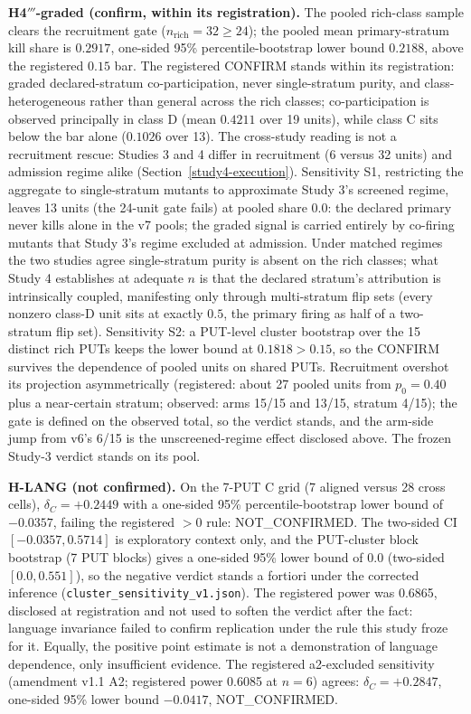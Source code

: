 \documentclass[manuscript,screen,review]{acmart}
\begin{document}
\textbf{H4\('''\)-graded (confirm, within its registration).} The pooled
rich-class sample clears the recruitment gate
(\(n_{\mathrm{rich}} = 32 \geq 24\)); the pooled mean primary-stratum kill
share is \(0.2917\), one-sided 95\% percentile-bootstrap lower bound
\(0.2188\), above the registered \(0.15\) bar. The registered CONFIRM stands
within its registration: graded declared-stratum co-participation, never
single-stratum purity, and class-heterogeneous rather than general across the
rich classes; co-participation is observed principally in class D (mean
\(0.4211\) over 19 units), while class C sits below the bar alone
(\(0.1026\) over 13). The cross-study
reading is not a recruitment rescue: Studies 3 and 4 differ in recruitment
(6 versus 32 units) and admission regime alike
(Section~\ref{study4-execution}). Sensitivity S1, restricting the aggregate
to single-stratum mutants to approximate Study 3's screened regime, leaves 13
units (the 24-unit gate fails) at pooled share \(0.0\): the declared primary
never kills alone in the v7 pools; the graded signal is carried entirely by
co-firing mutants that Study 3's regime excluded at admission. Under matched
regimes the two studies agree single-stratum purity is absent on the rich
classes; what Study 4 establishes at adequate \(n\) is that the declared
stratum's attribution is intrinsically coupled, manifesting only through
multi-stratum flip sets (every nonzero class-D unit sits at exactly \(0.5\),
the primary firing as half of a two-stratum flip set). Sensitivity S2: a
PUT-level cluster bootstrap over the 15 distinct rich PUTs keeps the lower
bound at \(0.1818 > 0.15\), so the CONFIRM survives the dependence of pooled
units on shared PUTs. Recruitment overshot its projection asymmetrically
(registered: about 27 pooled units from \(p_0 = 0.40\) plus a near-certain
stratum; observed: arms 15/15 and 13/15, stratum 4/15); the gate is defined
on the observed total, so the verdict stands, and the arm-side jump from v6's
6/15 is the unscreened-regime effect disclosed above. The frozen Study-3
verdict stands on its pool.

\textbf{H-LANG (not confirmed).} On the 7-PUT C grid (7 aligned versus 28
cross cells), \(\delta_C = +0.2449\) with a one-sided 95\%
percentile-bootstrap lower bound of \(-0.0357\), failing the registered
\(> 0\) rule: NOT\_CONFIRMED. The two-sided CI \([-0.0357, 0.5714]\) is
exploratory context only, and the PUT-cluster block bootstrap (7 PUT blocks)
gives a one-sided 95\% lower bound of \(0.0\) (two-sided \([0.0, 0.551]\)),
so the negative verdict stands a fortiori under the corrected inference
(\texttt{cluster\_sensitivity\_v1.json}). The registered power was 0.6865,
disclosed at registration and not used to soften the verdict after the fact:
language invariance failed to confirm replication under the rule this study
froze for it. Equally, the positive point estimate is not a demonstration of
language dependence, only insufficient evidence. The registered a2-excluded
sensitivity (amendment v1.1
A2; registered power 0.6085 at \(n = 6\)) agrees: \(\delta_C = +0.2847\),
one-sided 95\% lower bound \(-0.0417\), NOT\_CONFIRMED.
\end{document}
